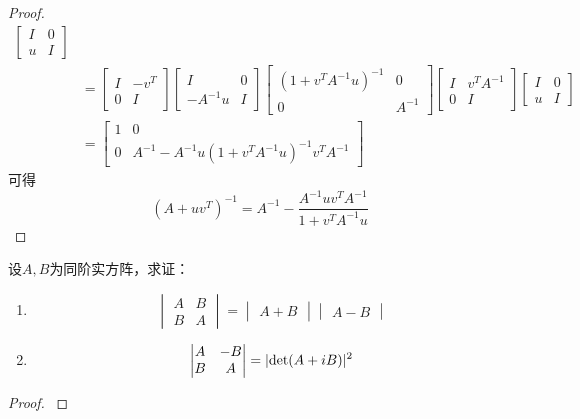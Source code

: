 \documentclass[twoside,openright]{book}
\begin{document}
\begin{CJK*}{UTF8}{}
\begin{proof}
\begin{align*}
\begin{bmatrix} I & 0 \\ u & I \end{bmatrix} \\
&=\begin{bmatrix} I & -v^T \\ 0 & I \end{bmatrix}\begin{bmatrix} I & 0\\ -A^{-1}u & I \end{bmatrix}
\begin{bmatrix} (1+v^TA^{-1}u)^{-1} & 0 \\ 0 & A^{-1}  \end{bmatrix}\begin{bmatrix} I & v^TA^{-1} \\ 0 & I \end{bmatrix}
\begin{bmatrix} I & 0 \\ u & I \end{bmatrix}\\
&=\begin{bmatrix}1 & 0 \\ 0 &A^{-1}-A^{-1}u (1+v^TA^{-1}u)^{-1}v^TA^{-1}  \end{bmatrix}
\end{align*}
可得
\[
(A+uv^T)^{-1}=A^{-1}-\frac{A^{-1}uv^TA^{-1}}{1+v^TA^{-1}u}
\]
\end{proof}

\begin{quest}
\label{quest:110}
设$A,B$为同阶实方阵，求证：
\begin{enumerate}
\item
\[
\begin{vmatrix}
A & B \\
B & A
\end{vmatrix}=
\begin{vmatrix} A + B \end{vmatrix}
\begin{vmatrix} A - B \end{vmatrix}
\]
\item
\[
\begin{vmatrix}
A & -B \\
B & A
\end{vmatrix}=
\lvert{\det(A + i B)}\rvert^2
\]
\end{enumerate}
\end{quest}
\begin{proof}
$ $


\end{proof}
\end{CJK*}
\end{document}
